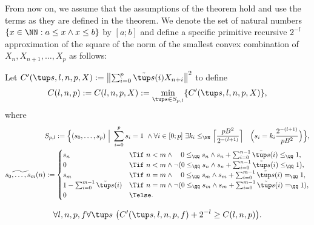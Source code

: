From now on, we assume that the assumptions of the theorem hold and use the terms as they are defined in the theorem. 
We denote the set of natural numbers $\{x\in\NN : a\leq x\wedge x\leq b\}$ by $[a;b]$ and define
a specific primitive recursive $2^{-l}$ approximation of the square of the norm of the smallest 
convex combination of $X_n, X_{n+1}, \ldots, X_p$ as follows:
\begin{dfn}[$C$]\label{d:C}  
Let $C'(\tup s, l,n,p, X) := \left\|\sum^{p}_{i=0} \tilde {\tup s}(i)X_{n+i}\right\|^2$ to define
\[
C(l,n,p) := C(l,n,p, X) := \min_{\tup s\in S_{p,l}}\{ C'(\tup s,l,n,p,X)\},
\] where
\begin{align*}
S_{p,l}:=\Big\{(s_0,\ldots,s_p)\ \Big|%
\ \sum^{p}_{i=0} s_i = 1 \ \wedge
 \forall i\in [0;p]\ \exists k_i\leq_\NN \Big\lceil\frac{pB^2}{2^{-(l+1)}}\Big\rceil\quad\Big( s_i=k_i\frac{2^{-(l+1)}}{pB^2}\Big)\Big\},\\
 \widetilde {s_0,\ldots,s_m}(n) := \begin{cases}
s_n&\Tif\ n< m\wedge \ \ \ 0\leq_\QQ s_n \wedge s_n+\sum^{n-1}_{i=0} \tilde {\tup s}(i) \leq_\QQ 1,\\
0&\Tif\ n< m\wedge \neg(   0\leq_\QQ s_n \wedge s_n+\sum^{n-1}_{i=0} \tilde {\tup s}(i) \leq_\QQ 1),\\
s_m&\Tif\ n= m\wedge \ \ \  0\leq_\QQ s_m \wedge s_m+\sum^{m-1}_{i=0} \tilde {\tup s}(i) =_\QQ 1,\\
1 - \sum^{m-1}_{i=0} \tilde{\tup s}(i)&\Tif\ n= m\wedge \neg(  0\leq_\QQ s_m \wedge s_m+\sum^{m-1}_{i=0} \tilde {\tup s}(i) =_\QQ 1),\\
0&\Telse.
\end{cases}\\
\end{align*}
\end{dfn}
\begin{lemma}\label{l:newC}
\[
\forall l,n,p,f \forall \tup s\ \big( C'(\tup s,l,n,p,f)+2^{-l}\geq C(l,n,p) \big).
\]
\end{lemma}

